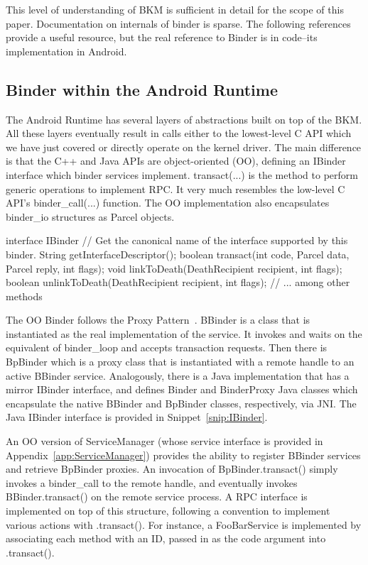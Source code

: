 \documentclass[prodmode]{acmlarge}
\begin{document}
This level of understanding of BKM is sufficient in detail for the scope of this paper. Documentation on internals of binder is sparse. The following references~\cite{BinderLinuxFoundation,BinderMastersThesis} provide a useful resource, but the real reference to Binder is in code--its implementation in Android.

\subsection{Binder within the Android Runtime}
The Android Runtime has several layers of abstractions built on top of the BKM. All these layers eventually result in calls either to the lowest-level C API which we have just covered or directly operate on the kernel driver. The main difference is that the C++ and Java APIs are object-oriented (OO), defining an IBinder interface which binder services implement. transact(...) is the method to perform generic operations to implement RPC. It very much resembles the low-level C API's binder\_call(...) function. The OO implementation also encapsulates binder\_io structures as Parcel objects.

\begin{snippet}[label=snip:IBinder]
interface IBinder {
  // Get the canonical name of the interface supported by this binder.
  String getInterfaceDescriptor();
  boolean transact(int code, Parcel data, Parcel reply, int flags);
  void linkToDeath(DeathRecipient recipient, int flags);
  boolean unlinkToDeath(DeathRecipient recipient, int flags);
  // ... among other methods
}
\end{snippet}

The OO Binder follows the Proxy Pattern~\cite{ProxyPattern}. BBinder is a class that is instantiated as the real implementation of the service. It invokes and waits on the equivalent of binder\_loop and accepts transaction requests. Then there is BpBinder which is a proxy class that is instantiated with a remote handle to an active BBinder service. Analogously, there is a Java implementation that has a mirror IBinder interface, and defines Binder and BinderProxy Java classes which encapsulate the native BBinder and BpBinder classes, respectively, via JNI. The Java IBinder interface is provided in Snippet~\ref{snip:IBinder}.

An OO version of ServiceManager (whose service interface is provided in Appendix~\ref{app:ServiceManager}) provides the ability to register BBinder services and retrieve BpBinder proxies. An invocation of BpBinder.transact() simply invokes a binder\_call to the remote handle, and eventually invokes BBinder.transact() on the remote service process. A RPC interface is implemented on top of this structure, following a convention to implement various actions with .transact(). For instance, a FooBarService is implemented by associating each method with an ID, passed in as the code argument into .transact().
\end{document}
